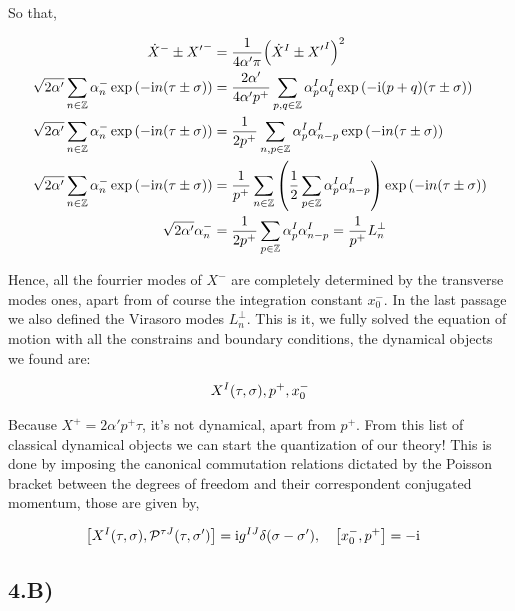 So that,

\begin{align*}
    {\dot X}^-\pm{X'}^-&=\frac{1}{4\alpha'\pi}\qty({\dot X}^I\pm{X'}^I)^2\\
    \sqrt{2\alpha'}\sum\limits_{n\in\mathbb Z}\alpha^-_n\exp\qty(-\textnormal{i} n\qty(\tau\pm\sigma))&=\frac{2\alpha'}{4\alpha' p^+}\sum\limits_{p,q\in\mathbb Z}\alpha^I_p\alpha^I_q\exp\qty(-\textnormal{i}\qty(p+q)\qty(\tau\pm\sigma))\\
    \sqrt{2\alpha'}\sum\limits_{n\in\mathbb Z}\alpha^-_n\exp\qty(-\textnormal{i} n\qty(\tau\pm\sigma))&=\frac{1}{2p^+}\sum\limits_{n,p\in\mathbb Z}\alpha^I_p\alpha^I_{n-p}\exp\qty(-\textnormal{i} n\qty(\tau\pm\sigma))\\
    \sqrt{2\alpha'}\sum\limits_{n\in\mathbb Z}\alpha^-_n\exp\qty(-\textnormal{i} n\qty(\tau\pm\sigma))&=\frac{1}{p^+}\sum\limits_{n\in\mathbb Z}\qty(\frac12\sum\limits_{p\in\mathbb Z}\alpha^I_p\alpha^I_{n-p})\exp\qty(-\textnormal{i} n\qty(\tau\pm\sigma))\\
    \sqrt{2\alpha'}\alpha_n^-&=\frac{1}{2p^+}\sum\limits_{p\in\mathbb Z}\alpha_p^I\alpha_{n-p}^I=\frac{1}{p^+}L_n^\perp
\end{align*}

Hence, all the fourrier modes of $X^-$ are completely determined by the transverse modes ones, apart from of course the integration constant $x^-_0$. In the 
last passage we also defined the Virasoro modes $L_n^\perp$. This is it, we fully solved the equation of motion with all the constrains and boundary 
conditions, the dynamical objects we found are:

\begin{align*}
    X^I\qty(\tau,\sigma),p^+,x_0^-
\end{align*}

Because $X^+=2\alpha'p^+\tau$, it's not dynamical, apart from $p^+$. From this list of classical dynamical objects we can start the quantization of 
our theory! This is done by imposing the canonical commutation relations dictated by the Poisson bracket between the degrees of freedom and their correspondent 
conjugated momentum, those are given by,

\begin{align*}
    \comm{X^I\qty(\tau,\sigma)}{\mathcal P^{\tau J}\qty(\tau,\sigma')}&=\im g^{IJ}\delta\qty(\sigma-\sigma'),\ \ \ \comm{x_0^-}{p^+}=-\im
\end{align*}

\subsection{4.B)}